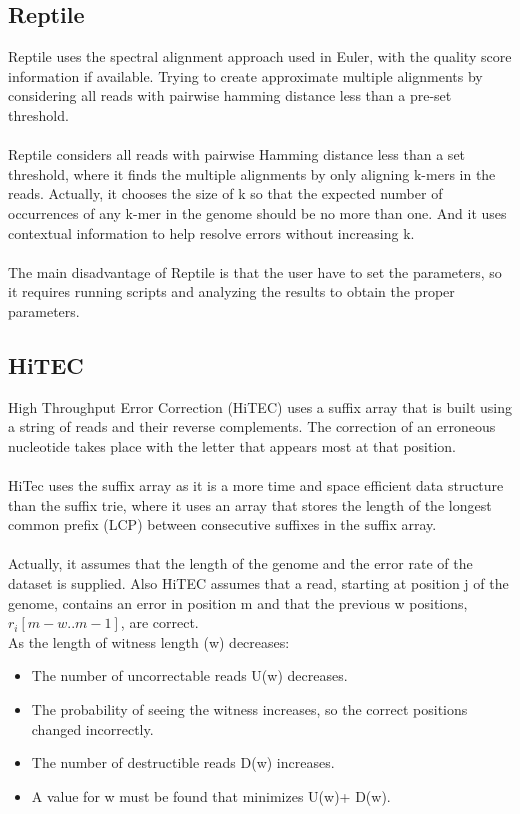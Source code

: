 \documentclass[12pt,openany]{llncs}
\begin{document}
\subsection{Reptile}
Reptile \cite{Reptile} uses the spectral alignment approach used in Euler, with the quality score information if available. Trying to create approximate multiple alignments by considering all reads with pairwise hamming distance less than a pre-set threshold. 
\\
\\
Reptile considers all reads with pairwise Hamming distance less than a set threshold, where it finds the multiple alignments by only aligning k-mers in the reads. Actually, it chooses the size of k so that the expected number of occurrences of any k-mer in the genome should be no more than one. And it uses contextual information to help resolve errors without increasing k.
\\
\\
The main disadvantage of Reptile is that the user have to set the parameters, so it
requires running scripts and analyzing the results to obtain the proper parameters.

\subsection{HiTEC}
High Throughput Error Correction (HiTEC) \cite{HiTec} uses a suffix array that is built using a string of reads and their reverse complements. The correction of an erroneous nucleotide takes place with the letter that appears most at that position.
\\
\\
HiTec uses the suffix array as it is a more time and space efficient data structure than the suffix trie, where it uses an array that stores the length of the longest common prefix (LCP) between consecutive suffixes in the suffix array.
\\
\\
Actually, it assumes that the length of the genome and the error rate of the dataset is supplied. Also HiTEC assumes that a read, starting at position j of the genome, contains an error in position m and that the previous w positions, $r_{i} [m - w..m - 1]$, are correct.
\\
As the length of witness length (w) decreases:

\begin{itemize}
	\item The number of uncorrectable reads U(w) decreases.
	\item The probability of seeing the witness increases, so the correct positions changed incorrectly. 
	\item The number of destructible reads D(w) increases.
	\item A value for w must be found that minimizes U(w)+ D(w). 
\end{itemize}
\end{document}
